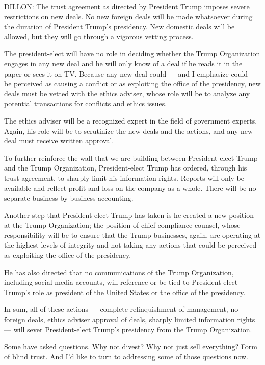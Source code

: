 DILLON: The trust agreement as directed by President Trump imposes
severe restrictions on new deals. No new foreign deals will be made
whatsoever during the duration of President Trump's presidency. New
domestic deals will be allowed, but they will go through a vigorous
vetting process.

The president-elect will have no role in deciding whether the Trump
Organization engages in any new deal and he will only know of a deal if
he reads it in the paper or sees it on TV. Because any new deal could
--- and I emphasize could --- be perceived as causing a conflict or as
exploiting the office of the presidency, new deals must be vetted with
the ethics adviser, whose role will be to analyze any potential
transactions for conflicts and ethics issues.

The ethics adviser will be a recognized expert in the field of
government experts. Again, his role will be to scrutinize the new deals
and the actions, and any new deal must receive written approval.

To further reinforce the wall that we are building between
President-elect Trump and the Trump Organization, President-elect Trump
has ordered, through his trust agreement, to sharply limit his
information rights. Reports will only be available and reflect profit
and loss on the company as a whole. There will be no separate business
by business accounting.

Another step that President-elect Trump has taken is he created a new
position at the Trump Organization; the position of chief compliance
counsel, whose responsibility will be to ensure that the Trump
businesses, again, are operating at the highest levels of integrity and
not taking any actions that could be perceived as exploiting the office
of the presidency.

He has also directed that no communications of the Trump Organization,
including social media accounts, will reference or be tied to
President-elect Trump's role as president of the United States or the
office of the presidency.

In sum, all of these actions --- complete relinquishment of management,
no foreign deals, ethics adviser approval of deals, sharply limited
information rights --- will sever President-elect Trump's presidency
from the Trump Organization.

Some have asked questions. Why not divest? Why not just sell everything?
Form of blind trust. And I'd like to turn to addressing some of those
questions now.

